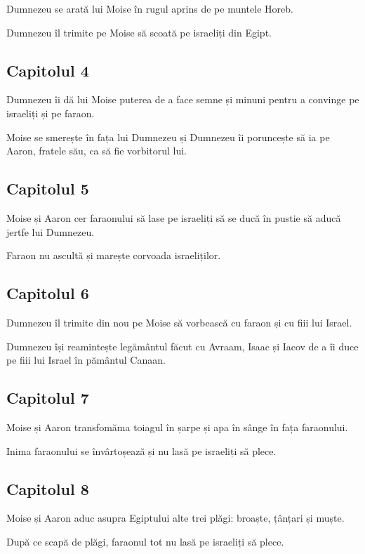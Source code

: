 \documentclass[12pt,a4paper]{article}
\begin{document}
Dumnezeu se arată lui Moise în rugul aprins de pe muntele Horeb.

Dumnezeu îl trimite pe Moise să scoată pe israeliți din Egipt.

\subsection{Capitolul 4}

Dumnezeu îi dă lui Moise puterea de a face semne și minuni pentru a convinge pe israeliți și pe faraon.

Moise se smerește în fața lui Dumnezeu și Dumnezeu îi poruncește să ia pe Aaron, fratele său, ca să fie vorbitorul lui.

\subsection{Capitolul 5}

Moise și Aaron cer faraonului să lase pe israeliți să se ducă în pustie să aducă jertfe lui Dumnezeu.

Faraon nu ascultă și marește corvoada israeliților.

\subsection{Capitolul 6}

Dumnezeu îl trimite din nou pe Moise să vorbească cu faraon și cu fiii lui Israel.

Dumnezeu își reamintește legământul făcut cu Avraam, Isaac și Iacov de a îi duce pe fiii lui Israel în pământul Canaan.

\subsection{Capitolul 7}

Moise și Aaron transfomăma toiagul în șarpe și apa în sânge în fața faraonului.

Inima faraonului se învârtoșează și nu lasă pe israeliți să plece.

\subsection{Capitolul 8}

Moise și Aaron aduc asupra Egiptului alte trei plăgi: broaște, țânțari și muște.

După ce scapă de plăgi, faraonul tot nu lasă pe israeliți să plece.
\end{document}
